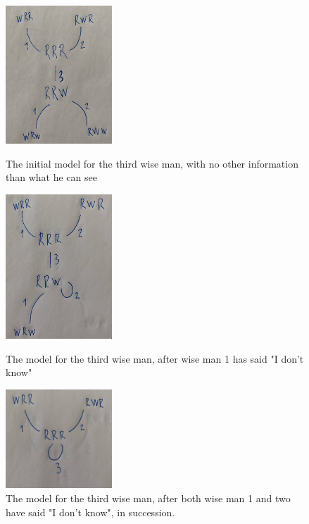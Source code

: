 \begin{figure}
	\begin{minipage}[c]{3cm}
\includegraphics[width=4cm]{images/three_wise_men_round_0.png}
	\caption{The initial model for the third wise man, with no other information than what he can see}

	\label{fig:twm-round-0}
\end{minipage}
\hfill
	\begin{minipage}[c]{3cm}
	\includegraphics[width=4cm]{images/three_wise_men_round_1.png}
	\caption{The model for the third wise man, after wise man 1 has said "I don't know"}

	\label{fig:twm-round-1}
\end{minipage}
\hfill
	\begin{minipage}[c]{3cm}
	\includegraphics[width=4cm]{images/three_wise_men_round_2.png}
	\caption{The model for the third wise man, after both wise man 1 and two have said "I don't know", in succession.}

	\label{fig:twm-round-2}
\end{minipage}
\end{figure}


